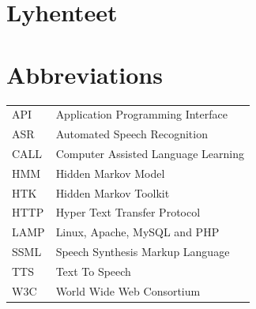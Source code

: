 \documentclass[11pt,a4paper,oneside,article]{memoir}
\begin{document}

\pagestyle{empty} %
\tableofcontents*
\pagestyle{empty} %
\clearpage
\pagestyle{plain}




\pagestyle{empty}
\setlength{\parskip}{1cm}
 {
  \chapter*{Lyhenteet}
} {
  \chapter*{Abbreviations}
}
\begin{table}[h]
\setlength{\tabcolsep}{8pt}
\renewcommand{\arraystretch}{2}
\begin{tabular}{l p{12cm}}

API & Application Programming Interface\\
ASR & Automated Speech Recognition\\
CALL & Computer Assisted Language Learning\\
HMM & Hidden Markov Model\\
HTK & Hidden Markov Toolkit\\
HTTP & Hyper Text Transfer Protocol \\
LAMP & Linux, Apache, MySQL and PHP \\
SSML & Speech Synthesis Markup Language\\
TTS & Text To Speech\\
W3C & World Wide Web Consortium \\

\end{tabular}
\end{table}

\newpage
\end{document}
